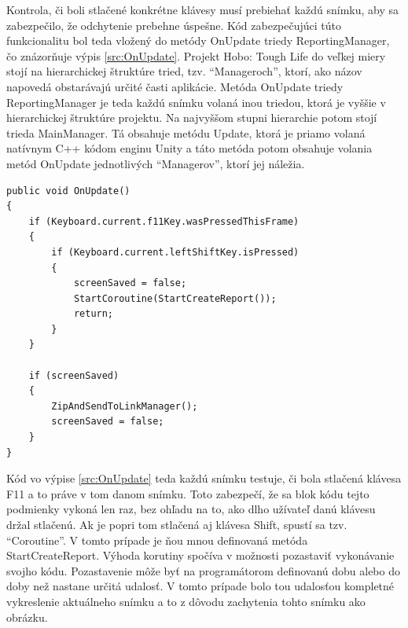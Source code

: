 \documentclass[slovak,bachelorpractice,dept460,male,csharp,cpdeclaration]{diploma}
\begin{document}
Kontrola, či boli stlačené konkrétne klávesy musí prebiehať každú snímku, aby sa zabezpečilo, že odchytenie prebehne úspešne. Kód zabezpečujúci túto funkcionalitu bol teda vložený do metódy OnUpdate triedy ReportingManager, čo znázorňuje výpis \ref{src:OnUpdate}. Projekt Hobo: Tough Life do veľkej miery stojí na hierarchickej štruktúre tried, tzv. \enquote{Manageroch}, ktorí, ako názov napovedá obstarávajú určité časti aplikácie. Metóda OnUpdate triedy ReportingManager je teda každú snímku volaná inou triedou, ktorá je vyššie v hierarchickej štruktúre projektu. Na najvyššom stupni hierarchie potom stojí trieda MainManager. Tá obsahuje metódu Update, ktorá je priamo volaná natívnym C++ kódom enginu Unity a táto metóda potom obsahuje volania metód OnUpdate jednotlivých \enquote{Managerov}, ktorí jej náležia.
\vspace{10pt}
\begin{lstlisting}[label=src:OnUpdate,caption={Metóda OnUpdate triedy ReportingManager}]
public void OnUpdate()
{
    if (Keyboard.current.f11Key.wasPressedThisFrame)
    {
        if (Keyboard.current.leftShiftKey.isPressed)
        {
            screenSaved = false;
            StartCoroutine(StartCreateReport());
            return;
        }
    }

    if (screenSaved)
    {
        ZipAndSendToLinkManager();
        screenSaved = false;
    }
}
\end{lstlisting}

Kód vo výpise \ref{src:OnUpdate} teda každú snímku testuje, či bola stlačená klávesa F11 a to práve v tom danom snímku. Toto zabezpečí, že sa blok kódu tejto podmienky vykoná len raz, bez ohľadu na to, ako dlho užívateľ danú klávesu držal stlačenú. Ak je popri tom stlačená aj klávesa Shift, spustí sa tzv. \enquote{Coroutine}. V tomto prípade je ňou mnou definovaná metóda StartCreateReport. Výhoda korutiny spočíva v možnosti pozastaviť vykonávanie svojho kódu. Pozastavenie môže byť na programátorom definovanú dobu alebo do doby než nastane určitá udalosť. V tomto prípade bolo tou udalosťou kompletné vykreslenie aktuálneho snímku a to z dôvodu zachytenia tohto snímku ako obrázku.
\end{document}
